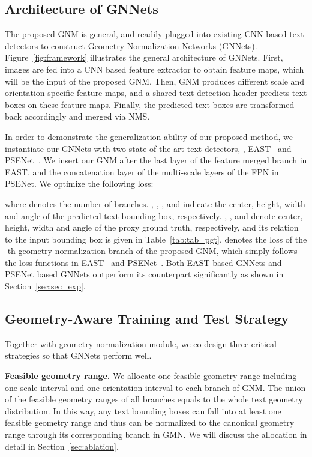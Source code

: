 \documentclass[10pt,twocolumn,letterpaper]{article}
\begin{document}
\subsection{Architecture of GNNets}
The proposed GNM is general, and readily plugged into existing CNN based text detectors to construct Geometry Normalization Networks (GNNets). Figure~\ref{fig:framework} illustrates the general architecture of GNNets.
First,   images are fed into a CNN based feature extractor to obtain feature maps, which will be the input of the proposed GNM. Then, GNM  produces different scale and orientation specific feature maps, and a shared text detection header predicts text boxes on these feature maps. Finally, the predicted text boxes are transformed back accordingly and merged via NMS.


In order to demonstrate the generalization ability of our proposed method, we instantiate our GNNets with two state-of-the-art text detectors, \ie, EAST~\cite{Zhou2017} and PSENet~\cite{li2018shape}. We insert our GNM after the last layer of the feature merged branch in EAST, and the concatenation layer of the multi-scale layers of the FPN in PSENet. We optimize the following loss:

where  denotes the number of branches.  , , , and  indicate the center, height, width and angle of the predicted text bounding box, respectively. , ,  and  denote center, height, width and angle of the proxy ground truth, respectively, and its relation to the input bounding box  is given in Table~\ref{tab:tab_pgt}.
 denotes the loss of the -th geometry normalization branch of the proposed GNM, which simply follows the loss functions in EAST~\cite{Zhou2017} and PSENet~\cite{li2018shape}. Both EAST based GNNets and PSENet based GNNets outperform its counterpart significantly as shown in Section~\ref{sec:sec_exp}.






\subsection{Geometry-Aware Training and Test Strategy}\label{training_and_test_strategy}
Together with geometry normalization module, we co-design  three critical strategies so that GNNets perform well.


\textbf{Feasible geometry range.} We allocate one feasible geometry range including one scale interval and one orientation interval  to each branch of GNM.
The union of the feasible geometry ranges of all branches  equals to the whole text geometry distribution. In this way, any text bounding boxes can fall into
at least one feasible geometry range and thus can be normalized to the canonical geometry range through its corresponding branch in GMN. We will discuss the allocation in detail in Section~\ref{sec:ablation}.
\end{document}
